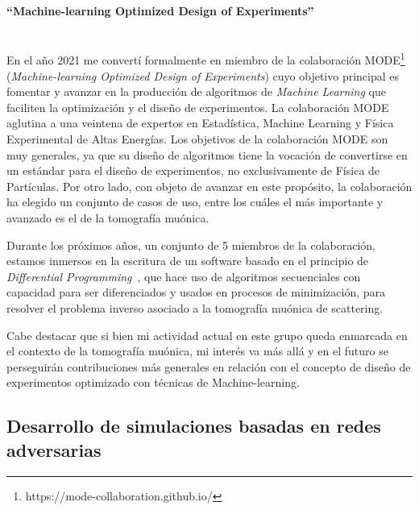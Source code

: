 \paragraph{``Machine-learning Optimized Design of Experiments''\\\\}

En el año 2021 me convertí formalmente en miembro de la colaboración MODE\footnote{https://mode-collaboration.github.io/} (\emph{Machine-learning Optimized Design of Experiments}) cuyo objetivo principal es fomentar y avanzar en la producción de algoritmos de \emph{Machine Learning} que faciliten la optimización y el diseño de experimentos. La colaboración MODE aglutina a una veintena de expertos en Estadística, Machine Learning y Física Experimental de Altas Energías. Los objetivos de la colaboración MODE son muy generales, ya que su diseño de algoritmos tiene la vocación de convertirse en un estándar para el diseño de experimentos, no exclusivamente de Física de Partículas. Por otro lado, con objeto de avanzar en este propósito, la colaboración ha elegido un conjunto de casos de uso, entre los cuáles el más importante y avanzado es el de la tomografía muónica. 

Durante los próximos años, un conjunto de 5 miembros de la colaboración, estamos inmersos en la escritura de un software basado en el principio de \emph{Differential Programming}~\cite{bib:differentialprogramming}, que hace uso de algoritmos secuenciales con capacidad para ser diferenciados y usados en procesos de minimización, para resolver el problema inverso asociado a la tomografía muónica de scattering. 

Cabe destacar que si bien mi actividad actual en este grupo queda enmarcada en el contexto de la tomografía muónica, mi interés va más allá y en el futuro se perseguirán contribuciones más generales en relación con el concepto de diseño de experimentos optimizado con técnicas de Machine-learning.

\subsection{Desarrollo de simulaciones basadas en redes adversarias}

